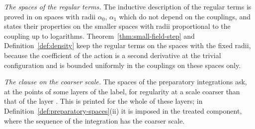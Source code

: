 \documentclass[11pt]{preprint}
\numberwithin{equation}{section}
\begin{document}
\emph{The spaces of the regular terms.} The inductive description of the regular terms is proved in \cite[Theorem~3, p.~264]{BalabanRG1} on spaces with radii $\alpha_0$, $\alpha_1$ which do not depend on the couplings, and \cite[(2.26)--(2.28), p.~259]{BalabanCRE} states their properties on the smaller spaces with radii proportional to the coupling up to logarithms. Theorem~\ref{thm:small-field-step} and Definition~\ref{def:density} keep the regular terms on the spaces with the fixed radii, because the coefficient of the action is a second derivative at the trivial configuration and is bounded uniformly in the couplings on these spaces only.

\emph{The clause on the coarser scale.} The spaces of the preparatory integrations ask, at the points of some layers of the label, for regularity at a scale coarser than that of the layer \cite[(1.66), p.~190]{BalabanLFR1}. This is printed for the whole of these layers; in Definition~\ref{def:preparatory-spaces}(ii) it is imposed in the treated component, where the sequence of the integration has the coarser scale.
\end{document}
